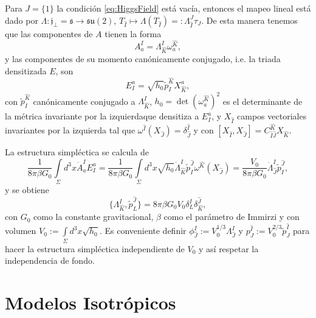 Para $J=\{1\}$ la condici\'{o}n \eqref{eq:HiggsField} est\'{a} vac\'{i}a, entonces el mapeo lineal est\'{a} dado por $\Lambda: \mathfrak{j}_{\perp} = \mathfrak{s} \longrightarrow \mathfrak{su}(2)$, $T_{\hat{I}} \longmapsto \Lambda(T_{\hat{I}}) =: \Lambda^{J}_{\hat{I}} \tau_{J}$. De esta manera tenemos que las componentes de $A$ tienen la forma
%
\begin{equation}
A^{I}_{a} = \Lambda^{I}_{\hat{K}} \omega^{\hat{K}}_{a},
\end{equation}
%
y las componentes de su momento can\'{o}nicamente conjugado, i.e. la triada densitizada $E$, son
%
\begin{equation}
E^{a}_{I} = \sqrt{h_{0}} \tilde{p}^{\hat{K}}_{I} X^{a}_{\hat{K}},
\end{equation}
%
con $\tilde{p}^{\hat{K}}_{I}$ can\'{o}nicamente conjugado a $\Lambda^{I}_{\hat{K}}$, $h_{0} = \det(\omega^{\hat{K}}_{a})^{2}$ es el determinante de la m\'{e}trica invariante por la izquierda\footnotemark que densitiza a $E^{a}_{I}$, y $X_{\hat{I}}$ campos vectoriales invariantes por la izquierda tal que $\omega^{\hat{I}}(X_{\hat{J}}) = \delta^{\hat{I}}_{\hat{J}}$ y con $[X_{\hat{I}}, X_{\hat{J}}] = C^{\hat{K}}_{\hat{I} \hat{J}} X_{\hat{K}}$.

La estructura simpl\'{e}ctica se calcula de
%
\begin{equation}
\frac{1}{8 \pi \beta G_{0}} \int\limits_{\Sigma} d^{3} x \dot{A}^{I}_{a} E^{a}_{I} = \frac{1}{8 \pi \beta G_{0}} \int\limits_{\Sigma} d^{3} x \sqrt{h_{0}} \dot{\Lambda}^{I}_{\hat{K}} \tilde{p}^{\hat{J}}_{I} \omega^{\hat{K}} (X_{\hat{J}}) = \frac{V_{0}}{8 \pi \beta G_{0}} \dot{\Lambda}^{I}_{\hat{J}} \tilde{p}^{\hat{J}}_{I},
\end{equation}
%
y se obtiene
%
\begin{equation}
\{\Lambda^{I}_{\hat{K}}, \tilde{p}^{\hat{J}}_{L} \} = 8 \pi \beta G_{0} V_{0} \delta^{I}_{L} \delta^{\hat{J}}_{\hat{K}},
\end{equation}
%
con $G_{0}$ como la constante gravitacional, $\beta$ como el par\'{a}metro de Immirzi y con volumen $V_{0} := \int\limits_{\Sigma} d^{3} x  \sqrt{h_{0}}$. Es conveniente definir $\phi^{I}_{\hat{J}} := V_{0}^{1/3} \Lambda^{I}_{\hat{J}}$ y $p^{\hat{I}}_{J} := V_{0}^{2/3} \tilde{p}^{\hat{I}}_{J}$ para hacer la estructura simpl\'{e}ctica independiente de $V_{0}$ y as\'{i} respetar la independencia de fondo.

\section{Modelos Isotr\'{o}picos}

